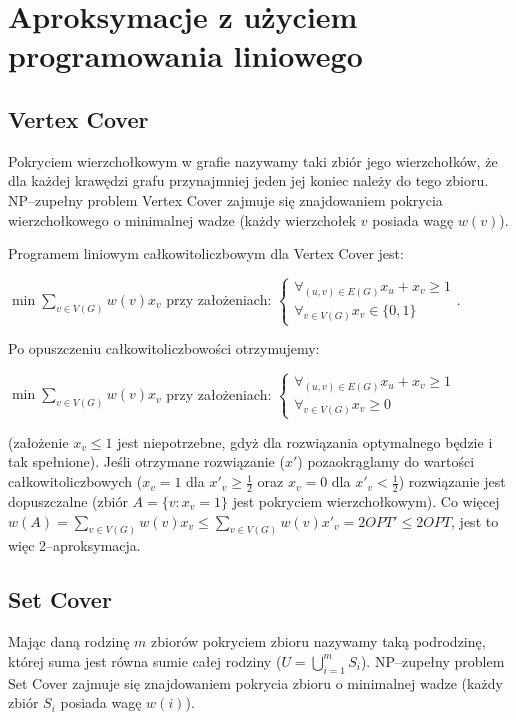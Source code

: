 \documentclass[licencjacka]{pracamgr}
\begin{document}
   \section{Aproksymacje z użyciem programowania liniowego}
    \subsection{Vertex Cover}
Pokryciem wierzchołkowym w grafie nazywamy taki zbiór jego wierzchołków, że dla każdej krawędzi grafu przynajmniej jeden jej koniec należy do tego zbioru.
NP--zupełny problem Vertex Cover zajmuje się znajdowaniem pokrycia wierzchołkowego o minimalnej wadze (każdy wierzchołek $v$ posiada wagę $w(v)$).\newline

Programem liniowym całkowitoliczbowym dla Vertex Cover jest:\newline
\centerline{$\min\sum\limits_{v\in V(G)}w(v)x_v$ przy założeniach: 
$\left\{\begin{array}{c}
\forall_{(u,v)\in E(G)}x_u+x_v\ge1\\
\forall_{v\in V(G)}x_{v}\in\{0,1\}
\end{array}\right.$.}\newline
Po opuszczeniu całkowitoliczbowości otrzymujemy:\newline
\centerline{$\min\sum\limits_{v\in V(G)}w(v)x_v$ przy założeniach: 
$\left\{\begin{array}{c}
\forall_{(u,v)\in E(G)}x_u+x_v\ge1\\
\forall_{v\in V(G)}x_v\ge0
\end{array}\right.$}\newline
(założenie $x_v\le1$ jest niepotrzebne, gdyż dla rozwiązania optymalnego będzie i tak spełnione).\newline
Jeśli otrzymane rozwiązanie ($x'$) pozaokrąglamy do wartości całkowitoliczbowych ($x_v=1$ dla $x'_v\ge\frac{1}{2}$ oraz $x_v=0$ dla $x'_v<\frac{1}{2}$)
rozwiązanie jest dopuszczalne (zbiór $A=\{v:x_v=1\}$ jest pokryciem wierzchołkowym).\newline
Co więcej $w(A)=\sum\limits_{v\in V(G)}w(v)x_v\le\sum\limits_{v\in V(G)}w(v)x'_v=2 OPT'\le2 OPT$, jest to więc 2--aproksymacja.\newline
%
    \subsection{Set Cover}
Mając daną rodzinę $m$ zbiorów pokryciem zbioru nazywamy taką podrodzinę, której suma jest równa sumie całej rodziny ($U=\bigcup\limits_{i=1}^{m}S_i$).
NP--zupełny problem Set Cover zajmuje się znajdowaniem pokrycia zbioru o minimalnej wadze (każdy zbiór $S_i$ posiada wagę $w(i)$).\newline
\end{document}
